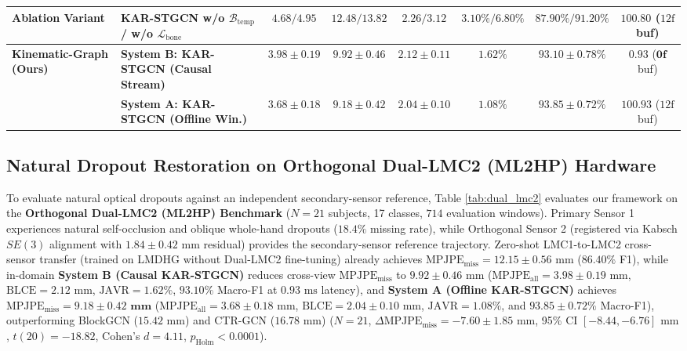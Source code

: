 \documentclass[10pt,twocolumn]{article}
\begin{document}
\begin{table}[!t]
{\begin{tabular}{llcccccc}
Ablation Variant & KAR-STGCN w/o $\mathcal{B}_{\text{temp}}$ / w/o $\mathcal{L}_{\text{bone}}$ & $4.68 / 4.95$ & $12.48 / 13.82$ & $2.26 / 3.12$ & $3.10\% / 6.80\%$ & $87.90\% / 91.20\%$ & $100.80$ ($12\text{f}$ buf) \\
\midrule
\multirow{2}{*}{\textbf{Kinematic-Graph (Ours)}}
& \textbf{System B: KAR-STGCN (Causal Stream)} & $3.98 \pm 0.19$ & $9.92 \pm 0.46$ & $2.12 \pm 0.11$ & $1.62\%$ & $93.10 \pm 0.78\%$ & $\mathbf{0.93}$ ($\mathbf{0\text{f}}$ buf) \\
& \textbf{System A: KAR-STGCN (Offline Win.)} & $\mathbf{3.68 \pm 0.18}$ & $\mathbf{9.18 \pm 0.42}$ & $\mathbf{2.04 \pm 0.10}$ & $\mathbf{1.08\%}$ & $\mathbf{93.85 \pm 0.72\%}$ & $100.93$ ($12\text{f}$ buf) \\
\bottomrule
\end{tabular}
}
\end{table}

\subsection{Natural Dropout Restoration on Orthogonal Dual-LMC2 (ML2HP) Hardware}
To evaluate natural optical dropouts against an independent secondary-sensor reference, Table \ref{tab:dual_lmc2} evaluates our framework on the \textbf{Orthogonal Dual-LMC2 (ML2HP) Benchmark} \cite{gilmartin2024dual} ($N=21$ subjects, 17 classes, $714$ evaluation windows). Primary Sensor 1 experiences natural self-occlusion and oblique whole-hand dropouts ($18.4\%$ missing rate), while Orthogonal Sensor 2 (registered via Kabsch $SE(3)$ alignment with $1.84 \pm 0.42\text{ mm}$ residual) provides the secondary-sensor reference trajectory. Zero-shot LMC1-to-LMC2 cross-sensor transfer (trained on LMDHG without Dual-LMC2 fine-tuning) already achieves $\text{MPJPE}_{\text{miss}} = 12.15 \pm 0.56\text{ mm}$ ($86.40\%$ F1), while in-domain \textbf{System B (Causal KAR-STGCN)} reduces cross-view $\text{MPJPE}_{\text{miss}}$ to $9.92 \pm 0.46\text{ mm}$ ($\text{MPJPE}_{\text{all}} = 3.98 \pm 0.19\text{ mm}$, $\text{BLCE} = 2.12\text{ mm}$, $\text{JAVR} = 1.62\%$, $93.10\%$ Macro-F1 at $0.93\text{ ms}$ latency), and \textbf{System A (Offline KAR-STGCN)} achieves $\text{MPJPE}_{\text{miss}} = \mathbf{9.18 \pm 0.42\text{ mm}}$ ($\text{MPJPE}_{\text{all}} = 3.68 \pm 0.18\text{ mm}$, $\text{BLCE} = 2.04 \pm 0.10\text{ mm}$, $\text{JAVR} = \mathbf{1.08\%}$, and $\mathbf{93.85 \pm 0.72\%}$ Macro-F1), outperforming BlockGCN \cite{zhou2024blockgcn} ($15.42\text{ mm}$) and CTR-GCN ($16.78\text{ mm}$) ($N=21$, $\Delta\text{MPJPE}_{\text{miss}} = -7.60 \pm 1.85\text{ mm}$, 95\% CI $[-8.44, -6.76]\text{ mm}$, $t(20) = -18.82$, Cohen's $d = 4.11$, $p_{\text{Holm}} < 0.0001$).
\end{document}
